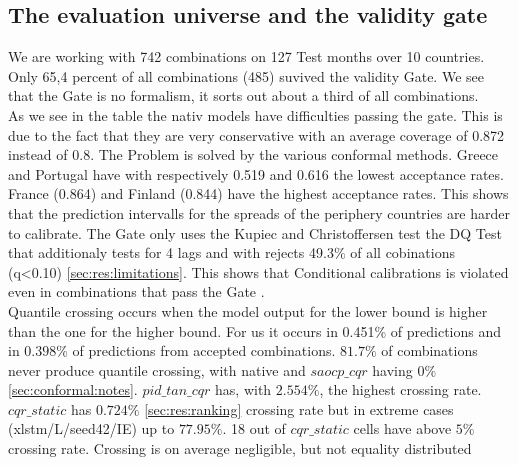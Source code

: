 \subsection{The evaluation universe and the validity gate}
\label{sec:res:gate}
We are working with 742 combinations on 127 Test months over 10 countries. Only 65,4 percent of all combinations (485) suvived the validity Gate. We see that the Gate is no formalism, it sorts out about a third of all combinations. \\
As we see in the table the nativ models have difficulties passing the gate. This is due to the fact that they are very conservative with an average coverage of 0.872 instead of 0.8. The Problem is solved by the various conformal methods. Greece and Portugal have with respectively 0.519 and 0.616 the lowest acceptance rates. France (0.864) and Finland (0.844) have the highest acceptance rates. This shows that the prediction intervalls for the spreads of the periphery countries are harder to calibrate. The Gate only uses the Kupiec and Christoffersen test the DQ Test that additionaly tests for 4 lags and with rejects 49.3$\%$ of all cobinations (q<0.10) \cref{sec:res:limitations}. This shows that Conditional calibrations is violated even in combinations that pass the Gate \cite{kupiec1995, christoffersen1998, engle2004caviar, benjamini1995fdr}.\\
Quantile crossing occurs when the model output for the lower bound is higher than the one for the higher bound. For us it occurs in 0.451$\%$ of predictions and in $0.398\%$ of predictions from accepted combinations. $81.7\%$ of combinations never produce quantile crossing, with native and $saocp\_cqr$ having $0\%$ \cref{sec:conformal:notes}.
$pid\_tan\_cqr$ has, with $2.554\%$, the highest crossing rate. $cqr\_static$ has $0.724\%$ \cref{sec:res:ranking} crossing rate but in extreme cases (xlstm/L/seed42/IE) up to $77.95\%$. 18 out of $cqr\_static$ cells have above $5\%$ crossing rate.
Crossing is on average negligible, but not equality distributed
